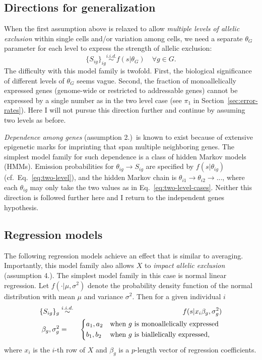 \documentclass[letterpaper]{article}
\begin{document}
\subsection{Directions for generalization}
\label{sec:generalizations}

When the first assumption above is relaxed to allow \emph{multiple levels of allelic exclusion}
within single cells and/or variation among cells, we need a separate
$\theta_G$ parameter for each level to express the strength of allelic
exclusion:
\begin{equation*}
\{S_{ig}\}_{ig} \overset{i.i.d.}{\sim} f(s | \theta_G) \quad \forall g \in G.
\end{equation*}
The difficulty with this model family is twofold.  First, the biological
significance of different levels of $\theta_G$ seems vague.  Second, the
fraction of monoallelically expressed genes (genome-wide or restricted to
addressable genes) cannot be expressed by a single number as in the two level
case  (see \(\pi_1\) in Section~\ref{sec:error-rates}).  Here I will not
pursue this direction further and continue by assuming two levels as before.

\emph{Dependence among genes} (assumption 2.)~is known to exist because of extensive epigenetic
marks for imprinting that span multiple neighboring genes.  The simplest model
family for such dependence is a class of hidden Markov models (HMMs).  Emission probabilities for
\(\theta_{ig}\rightarrow S_{ig}\) are specified by \(f(s | \theta_{ig})\)
(cf.~Eq.~\ref{eq:two-level}), and
the hidden Markov chain is
\(\theta_{i1}\rightarrow\theta_{i2}\rightarrow...\), where each
\(\theta_{ig}\) may only take the two values as in
Eq.~\ref{eq:two-level-cases}.  Neither this direction is followed further
here and I return to the independent genes hypothesis.

\subsection{Regression models}
\label{sec:regression-models}

The following regression models achieve an effect that is similar to
averaging.  Importantly, this model family also allows \(X\) to \emph{impact
allelic exclusion} (assumption 4.).  The simplest model family in this case is
normal linear regression.  Let \(f(\cdot|\mu,\sigma^2)\) denote the
probability density function of the normal distribution with mean
\(\mu\) and variance \(\sigma^2\).  Then for a given individual \(i\)
\begin{eqnarray}
\label{eq:normal-lm}
\{S_{ig}\}_g &\overset{i.i.d.}{\sim}& f(s | x_i \beta_g, \sigma^2_g) \\
\label{eq:shared-regression-param}
\beta_g,\sigma^2_g &=&
\begin{dcases*}
a_1, a_2 & when $g$ is monoallelically expressed \\
b_1, b_2 & when $g$ is biallelically expressed,
\end{dcases*}
\end{eqnarray}
where \(x_i\) is the \(i\)-th row of \(X\) and \(\beta_g\) is a \(p\)-length
vector of regression coefficients.
\end{document}

